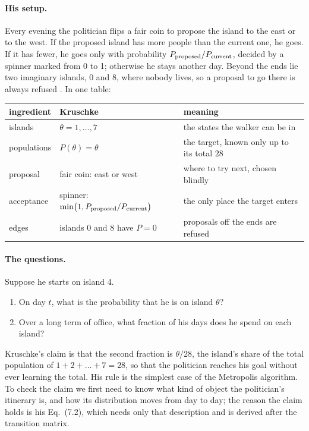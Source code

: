 \paragraph{His setup.}
Every evening the politician flips a fair coin to propose the island to the east or to the
west. If the proposed island has more people than the current one, he goes. If it has fewer,
he goes only with probability $P_{\rm proposed}/P_{\rm current}$, decided by a spinner marked
from 0 to 1; otherwise he stays another day. Beyond the ends lie two imaginary islands, 0 and
8, where nobody lives, so a proposal to go there is always refused
. In one table:
\begin{center}
\small
\begin{tabular}{@{}lll@{}}
  \toprule
  ingredient & Kruschke & meaning \\
  \midrule
  islands & $\theta=1,\dots,7$ & the states the walker can be in \\
  populations & $P(\theta)=\theta$ & the target, known only up to its total $28$ \\
  proposal & fair coin: east or west & where to try next, chosen blindly \\
  acceptance & spinner: $\min\bigl(1,P_{\rm proposed}/P_{\rm current}\bigr)$ & the only place the target enters \\
  edges & islands 0 and 8 have $P=0$ & proposals off the ends are refused \\
  \bottomrule
\end{tabular}
\end{center}

\paragraph{The questions.} Suppose he starts on island 4.
\begin{enumerate}[itemsep=1pt]
  \item On day $t$, what is the probability that he is on island $\theta$?
  \item Over a long term of office, what fraction of his days does he spend on each island?
\end{enumerate}
Kruschke's claim is that the second fraction is $\theta/28$, the island's share of the total
population of $1+2+\dots+7=28$, so that the politician reaches his goal without ever learning
the total. His rule is the simplest case of the Metropolis algorithm. To check the claim we
first need to know what kind of object the politician's itinerary is, and how its distribution
moves from day to day; the reason the claim holds is his Eq.~(7.2), which needs only that
description and is derived after the transition matrix.


